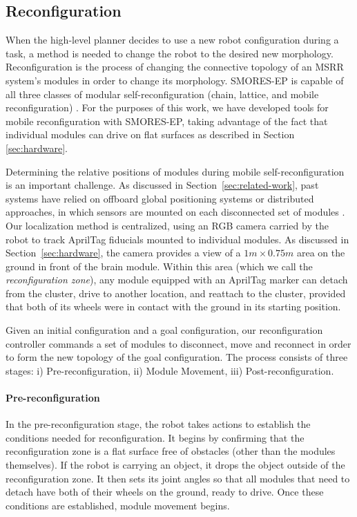 \documentclass[conference]{IEEEtran}
\newcommand{\TODO}[1]{ {\bf \textcolor{red}{TODO:} #1 }}
\begin{document}
\subsection{Reconfiguration}
\label{sec:reconfiguration}
%
When the high-level planner decides to use a new robot configuration during a task, a method is needed to change the robot to the desired new morphology. Reconfiguration is the process of changing the connective topology of an MSRR system's modules in order to change its morphology.  SMORES-EP is capable of all three classes of modular self-reconfiguration (chain, lattice, and mobile reconfiguration) \cite{Davey2012,yim2003modular}.  For the purposes of this work, we have developed tools for mobile reconfiguration with SMORES-EP, taking advantage of the fact that individual modules can drive on flat surfaces as described in Section \ref{sec:hardware}.

Determining the relative positions of modules during mobile self-reconfiguration is an important challenge. As discussed in Section~\ref{sec:related-work}, past systems have relied on offboard global positioning systems \cite{Paulos2015} or distributed approaches, in which sensors are mounted on each disconnected set of modules \cite{Yim2007}.  Our localization method is centralized, using an RGB camera carried by the robot to track AprilTag fiducials mounted to individual modules.  As discussed in Section~\ref{sec:hardware}, the camera provides a view of a $1m\times0.75m$ area on the ground in front of the brain module.  Within this area (which we call the \emph{reconfiguration zone}), any module equipped with an AprilTag marker can detach from the cluster, drive to another location, and reattach to the cluster, provided that both of its wheels were in contact with the ground in its starting position.%

Given an initial configuration and a goal configuration, our reconfiguration controller commands a set of modules to disconnect, move and reconnect in order to form the new topology of the goal configuration. The process consists of three stages: i) Pre-reconfiguration, ii) Module Movement, iii) Post-reconfiguration.

\paragraph{Pre-reconfiguration} In the pre-reconfiguration stage, the robot takes actions to establish the conditions needed for reconfiguration.  It begins by confirming that the reconfiguration zone is a flat surface free of obstacles (other than the modules themselves).  If the robot is carrying an object, it drops the object outside of the reconfiguration zone. It then  sets its joint angles so that all modules that need to detach have both of their wheels on the ground, ready to drive. Once these conditions are established, module movement begins.
\end{document}
